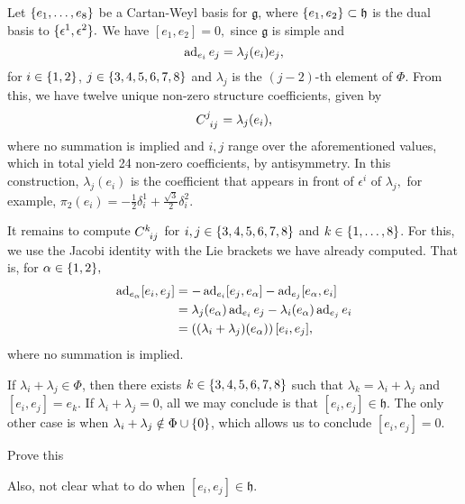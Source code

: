 Let \(\{e_1, \dots, e_8\}\) be a Cartan-Weyl basis for \(\mathfrak{g}\), where \(\{e_1, e_2\} \subset \mathfrak{h}\) is the dual basis to \(\{\epsilon^1, \epsilon^2\}.\) We have \([e_1,e_2] = 0,\) since \(\mathfrak{g}\) is simple and
\begin{equation*}
    \operatorname{ad}_{e_i}e_j = \lambda_{j}(e_i) e_j,
\end{equation*}
for \(i \in \{1,2\}\), \(j \in \{3,4,5,6,7,8\}\) and \(\lambda_j\) is the \((j-2)\)-th element of \(\Phi\). From this, we have twelve unique non-zero structure coefficients, given by
\begin{equation*}
    C\indices{^j_{ij}} = \lambda_{j}(e_i),
\end{equation*}
where no summation is implied and \(i,j\) range over the aforementioned values, which in total yield 24 non-zero coefficients, by antisymmetry. In this construction, \(\lambda_j(e_i)\) is the coefficient that appears in front of \(\epsilon^i\) of \(\lambda_j,\) for example, \(\pi_2(e_i) = -\frac{1}{2} \delta^1_i + \frac{\sqrt{3}}{2}\delta^2_i.\)

It remains to compute \(C\indices{^{k}_{ij}}\) for \(i,j \in \{3,4,5,6,7,8\}\) and \(k \in \{1,\dots,8\}\). For this, we use the Jacobi identity with the Lie brackets we have already computed. That is, for \(\alpha \in \{1,2\},\)
\begin{align*}
    \operatorname{ad}_{e_{\alpha}}[e_i, e_j] &= - \operatorname{ad}_{e_i}[e_j, e_{\alpha}] - \operatorname{ad}_{e_j}[e_{\alpha}, e_i]\\
                              &= \lambda_j(e_{\alpha})\operatorname{ad}_{e_i}e_j - \lambda_i(e_{\alpha})\operatorname{ad}_{e_j}e_i\\
                              &= \left((\lambda_i + \lambda_j)(e_{\alpha})\right)[e_i, e_j],
\end{align*}
where no summation is implied.

If \(\lambda_i + \lambda_j \in \Phi\), then there exists \(k \in \{3,4,5,6,7,8\}\) such that \(\lambda_k = \lambda_i + \lambda_j\) and \([e_i, e_j] = e_k.\) If \(\lambda_i + \lambda_j = 0\), all we may conclude is that \([e_i,e_j] \in \mathfrak{h}\). The only other case is when \(\lambda_i + \lambda_j \notin \Phi \cup \{0\}\), which allows us to conclude \([e_i,e_j]=0.\)

Prove this \todo

Also, not clear what to do when \([e_i, e_j] \in \mathfrak{h}.\) \todo
